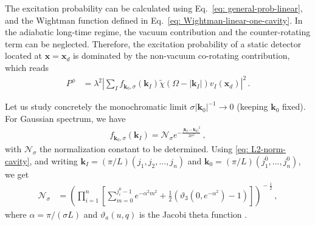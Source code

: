 \documentclass[prd,twocolumn,superscriptaddress,nofootinbib,floatfix,amsmath,amssymb]{revtex4-2}
\newcommand{\bx}{\bm{x}}
\newcommand{\bk}{{\bm{k}}}
\newcommand{\NN}{\mathcal{N}}
\begin{document}
    The excitation probability can be calculated using Eq.~\eqref{eq: general-prob-linear}, and the Wightman function defined in Eq.~\eqref{eq: Wightman-linear-one-cavity}. 
    In the adiabatic long-time regime, the vacuum contribution and the counter-rotating term can be neglected. Therefore, the excitation probability of a static detector located at $\bx=\bx_d$ is dominated by the non-vacuum co-rotating contribution, which reads
    \begin{align}
        P^\phi &= \lambda^2 \left|\sum_{I}f_{\bk_0,\sigma}(\bk_I)\tilde\chi(\Omega-|\bk_I|)v_I(\bx_d)\right|^2\,.
    \end{align}
    

    
    Let us study concretely the monochromatic limit \mbox{$\sigma |\bk_0|^{-1} \to 0$} (keeping $\bk_0$ fixed). For Gaussian spectrum, we have
    \begin{align}
        f_{\bk_0,\sigma}(\bk_I) = \NN_{\sigma}e^{-\frac{|\bk_I-\bk_0|^2}{2\sigma^2}}\,,
    \end{align}
    with $\NN_\sigma$ the normalization constant to be determined. Using \eqref{eq: L2-norm-cavity}, and writing $\bk_I = (\pi/L)(j_1,j_2,...,j_n)$ and $\bk_0 = (\pi/L)(j_1^0,...,j_n^0)$, we get
    \begin{align}
        \NN_\sigma &= \left(\prod_{i=1}^{n} \left[\sum_{m=0}^{j^0_i-1} e^{ -\alpha^2 m^2}+\frac{1}{2} \left(\vartheta _3(0,e^{-\alpha^2})-1\right)\right]\right)^{\!\!-\frac{1}{2}}\!\!\!\,,
    \end{align}
    where $\alpha = \pi/(\sigma L)$ and $\vartheta_a(u,q)$ is the Jacobi theta function \cite{NIST:DLMF}. 
    
\end{document}
